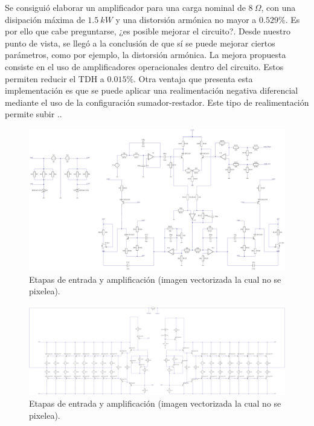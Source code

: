

	

Se consiguió elaborar un amplificador para una carga nominal de $8 \ \Omega$, con una disipación máxima de $1.5 \ kW$ y una distorsión armónica no mayor a $0.529\%$. Es por ello que cabe preguntarse, ¿es posible mejorar el circuito?. Desde nuestro punto de vista, se llegó a la conclusión de que sí se puede mejorar ciertos parámetros, como por ejemplo, la distorsión armónica. La mejora propuesta consiste en el uso de amplificadores operacionales dentro del circuito. Estos permiten reducir el TDH a $0.015 \%$. Otra ventaja que presenta esta implementación es que se puede aplicar una realimentación negativa diferencial mediante el uso de la configuración sumador-restador. Este tipo de realimentación permite subir ..

\begin{figure}[H]
\centering
	\includegraphics[width=\textwidth]{./ImagenesConclusiones/VOPTEX1.pdf}
	\caption{Etapas de entrada y amplificación (imagen vectorizada la cual no se pixelea).}	
\end{figure}
\begin{figure}[H]
\centering
	\includegraphics[width=\textwidth]{./ImagenesConclusiones/VOPTEX2.pdf}
	\caption{Etapas de entrada y amplificación (imagen vectorizada la cual no se pixelea).}
\end{figure}

